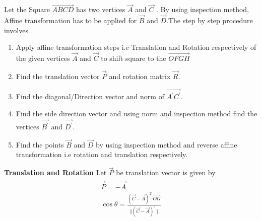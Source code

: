 \documentclass[journal,12pt,twocolumn]{IEEEtran}
\begin{document}
Let the Square $\vec{ABCD}$ has two vertices $\vec{A}$ and $\vec{C}$ . By using inspection method, Affine transformation has to be applied for $\vec{B}$ and $\vec{D}$.The step by step procedure involves
\begin{enumerate}
	\item Apply affine transformation steps i.e Translation and Rotation respectively of the given vertices $\vec{A}$ and $\vec{C}$ to shift square to the $\vec{OFGH}$ 
	\item Find the translation vector $\vec{P}$ and rotation matrix $\vec{R}$.
    \item Find the diagonal/Direction vector and norm of $\vec{A^{'}C^{'}}$.
    \item Find the side direction vector and using norm and inspection method find the vertices $\vec{B^{'}}$ and $\vec{D^{'}}$.
    \item Find the points $\vec{B}$ and $\vec{D}$ by using inspection method and reverse affine transformation i.e rotation and translation respectively.
\end{enumerate}
\textbf{Translation and Rotation}
Let $\vec{P}$ be translation vector is given by 
\begin{align}
\begin{split}
\vec{P} = -\vec{A}\\
\cos \theta = \frac{(\vec{C}-\vec{A})^T\  \vec{OG}}{\Vert(\vec{C}-\vec{A})^T\Vert}
    \end{split}
\end{align}
\end{document}
